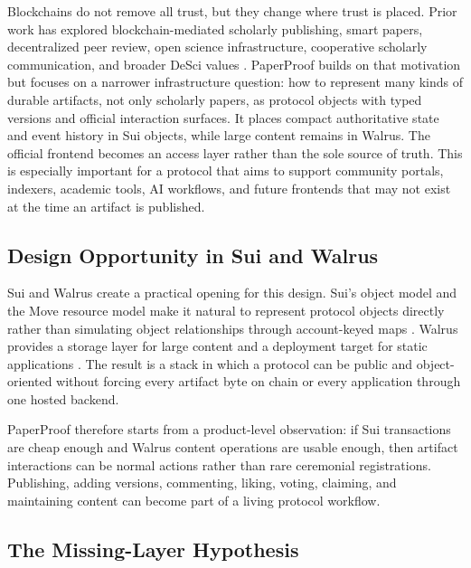 \documentclass[journal]{IEEEtran}
\begin{document}
Blockchains do not remove all trust, but they change where trust is placed. Prior work has explored blockchain-mediated scholarly publishing, smart papers, decentralized peer review, open science infrastructure, cooperative scholarly communication, and broader DeSci values \cite{hoffman2019scholarly,tenorio2021decentralizing,stojmenova2019publish,janowicz2018prospects,weidener2024desci,hoffman2020decentralization}. PaperProof builds on that motivation but focuses on a narrower infrastructure question: how to represent many kinds of durable artifacts, not only scholarly papers, as protocol objects with typed versions and official interaction surfaces. It places compact authoritative state and event history in Sui objects, while large content remains in Walrus. The official frontend becomes an access layer rather than the sole source of truth. This is especially important for a protocol that aims to support community portals, indexers, academic tools, AI workflows, and future frontends that may not exist at the time an artifact is published.

\subsection{Design Opportunity in Sui and Walrus}

Sui and Walrus create a practical opening for this design. Sui's object model and the Move resource model make it natural to represent protocol objects directly rather than simulating object relationships through account-keyed maps \cite{mysten2022sui,welc2023sui_move,blackshear2020move,sui_docs}. Walrus provides a storage layer for large content and a deployment target for static applications \cite{danezis2025walrus,walrus_docs}. The result is a stack in which a protocol can be public and object-oriented without forcing every artifact byte on chain or every application through one hosted backend.

PaperProof therefore starts from a product-level observation: if Sui transactions are cheap enough and Walrus content operations are usable enough, then artifact interactions can be normal actions rather than rare ceremonial registrations. Publishing, adding versions, commenting, liking, voting, claiming, and maintaining content can become part of a living protocol workflow.

\subsection{The Missing-Layer Hypothesis}
\end{document}
